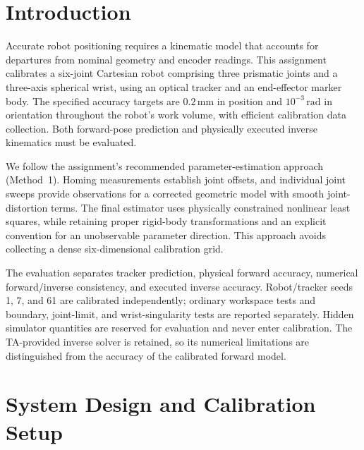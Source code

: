 
\section{Introduction}
\label{sec:introduction}

Accurate robot positioning requires a kinematic model that accounts for
departures from nominal geometry and encoder readings. This assignment
calibrates a six-joint Cartesian robot comprising three prismatic joints
and a three-axis spherical wrist, using an optical tracker and an
end-effector marker body. The specified accuracy targets are
$0.2\,\mathrm{mm}$ in position and $10^{-3}\,\mathrm{rad}$ in orientation
throughout the robot's work volume, with efficient calibration data
collection. Both forward-pose prediction and physically executed inverse
kinematics must be evaluated.

We follow the assignment's recommended parameter-estimation approach
(Method~1). Homing measurements establish joint offsets, and individual
joint sweeps provide observations for a corrected geometric model with
smooth joint-distortion terms. The final estimator uses physically
constrained nonlinear least squares, while retaining proper rigid-body
transformations and an explicit convention for an unobservable parameter
direction. This approach avoids collecting a dense six-dimensional
calibration grid.

The evaluation separates tracker prediction, physical forward accuracy,
numerical forward/inverse consistency, and executed inverse accuracy.
Robot/tracker seeds 1, 7, and 61 are calibrated independently; ordinary
workspace tests and boundary, joint-limit, and wrist-singularity tests
are reported separately. Hidden simulator quantities are reserved for
evaluation and never enter calibration. The TA-provided inverse solver
is retained, so its numerical limitations are distinguished from the
accuracy of the calibrated forward model.

\section{System Design and Calibration Setup}
\label{sec:system-design}

